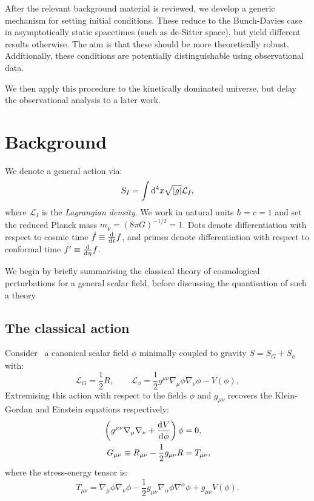 After the relevant background material is reviewed, we develop a generic mechanism for setting initial conditions. These reduce to the Bunch-Davies case in asymptotically static spacetimes (such as de-Sitter space), but yield different results otherwise. The aim is that these should be more theoretically robust. Additionally, these conditions are potentially distinguishable using observational data.

We then apply this procedure to the kinetically dominated universe, but delay the observational analysis to a later work.



\section{Background}
\label{sec:background}

\clearpage{}

We denote a general action via:
\begin{equation}
  S_I = \int \d[4]{x}\sqrt{|g|}\mathcal{L}_I,
  \label{eqn:general_action}
\end{equation}
where $\mathcal{L}_I$ is the {\em Lagrangian density}. We work in natural units $\hbar=c=1$ and set the reduced Planck mass $m_\mathrm{p} = {(8\pi G)}^{-1/2} = 1$. Dots denote differentiation with respect to cosmic time $\dot{f}\equiv \frac{\operatorname{d}^{}\!{}}{\operatorname{d}^{}\!{t}}f$, and primes denote differentiation with respect to conformal time ${{f}^\prime}\equiv\frac{\operatorname{d}^{}\!{}}{\operatorname{d}^{}\!{\eta}}f$.

We begin by briefly summarising the classical theory of cosmological perturbations for a general scalar field, before discussing the quantisation of such a theory


\subsection{The classical action}
\label{sec:inflation}
Consider~\cite{Baumann+2009} a canonical scalar field $\phi$ minimally coupled to gravity $S= S_G + S_\phi$ with:
\begin{equation}
  \mathcal{L}_G = \frac{1}{2}R, 
  \qquad
  \mathcal{L}_\phi = \frac{1}{2}g^{\mu\nu}\nabla_\mu\phi\nabla_\nu\phi - V(\phi),
  \label{eqn:action}
\end{equation}
Extremising this action with respect to the fields $\phi$ and $g_{\mu\nu}$ recovers the Klein-Gordan and Einstein equations respectively:
\begin{align}
  \left( g^{\mu\nu}\nabla_\mu\nabla_\nu + \frac{\d{V}}{\d{\phi}} \right) \phi &= 0,
  \label{eqn:klein_gordon}\\
  G_{\mu\nu}\equiv R_{\mu\nu}-\frac{1}{2}g_{\mu\nu}R&= T_{\mu\nu},
  \label{eqn:einstein}
\end{align}
where the stress-energy tensor is:
\begin{equation}
  T_{\mu\nu} = \nabla_\mu\phi \nabla_\nu\phi - \frac{1}{2}g_{\mu\nu} \nabla_\alpha\phi \nabla^\alpha\phi +g_{\mu\nu} V(\phi).
  \label{eqn:SET}
\end{equation}

